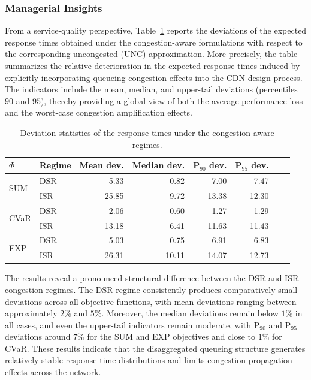 \documentclass[a4paper,11pt,reqno]{amsart}
\begin{document}
\subsubsection*{Managerial Insights}

From a service-quality perspective, Table~\ref{tab:multi_quality} reports the deviations of the expected response times obtained under the congestion-aware formulations with respect to the corresponding uncongested (UNC) approximation. More precisely, the table summarizes the relative deterioration in the expected response times induced by explicitly incorporating queueing congestion effects into the CDN design process. The indicators include the mean, median, and upper-tail deviations (percentiles $90$ and $95$), thereby providing a global view of both the average performance loss and the worst-case congestion amplification effects.

\begin{table}[h]
\begin{tabular}{llrrrrrr}
\toprule
$\Phi$ & Regime & Mean dev. & Median dev. & P$_{90}$ dev. & P$_{95}$ dev. \\
\midrule
\multirow{2}{*}{SUM} & DSR & 5.33 & 0.82 & 7.00 & 7.47 \\
 & ISR & 25.85 & 9.72 & 13.38 & 12.30 \\\midrule
\multirow{2}{*}{CVaR} & DSR & 2.06 & 0.60 & 1.27 & 1.29 \\
 & ISR & 13.18 & 6.41 & 11.63 & 11.43 \\\midrule
\multirow{2}{*}{EXP} & DSR & 5.03 & 0.75 & 6.91 & 6.83 \\
 & ISR & 26.31 & 10.11 & 14.07 & 12.73 \\
\bottomrule
\end{tabular}
\caption{Deviation statistics of the response times under the congestion-aware regimes.\label{tab:multi_quality}}
\end{table}

The results reveal a pronounced structural difference between the DSR and ISR congestion regimes. The DSR regime consistently produces comparatively small deviations across all objective functions, with mean deviations ranging between approximately $2\%$ and $5\%$. Moreover, the median deviations remain below $1\%$ in all cases, and even the upper-tail indicators remain moderate, with P$_{90}$ and P$_{95}$ deviations around $7\%$ for the SUM and EXP objectives and close to $1\%$ for CVaR. These results indicate that the disaggregated queueing structure generates relatively stable response-time distributions and limits congestion propagation effects across the network.
\end{document}
